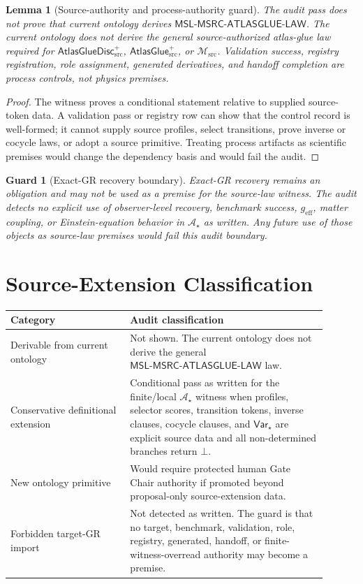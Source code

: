 \documentclass[11pt]{article}
\newcommand{\Msrc}{\mathcal{M}_{\mathrm{src}}}
\newcommand{\geff}{g_{\mathrm{eff}}}
\newcommand{\AtlasGlue}{\mathsf{AtlasGlue}_{\mathrm{src}}^{+}}
\newcommand{\AtlasGlueDisc}{\mathsf{AtlasGlueDisc}_{\mathrm{src}}^{+}}
\newcommand{\MSL}{\mathsf{MSL}\mbox{-}\mathsf{MSRC}\mbox{-}\mathsf{ATLASGLUE}\mbox{-}\mathsf{LAW}}
\newcommand{\Bot}{\bot}
\newcommand{\Astar}{\mathcal A_{\star}}
\newcommand{\Varstar}{\mathsf{Var}_{\star}}
\newtheorem{lemma}{Lemma}
\newtheorem{guard}{Guard}
\begin{document}
\begin{lemma}[Source-authority and process-authority guard]
The audit pass does not prove that current ontology derives \(\MSL\). The
current ontology does not derive the general source-authorized atlas-glue law
required for \(\AtlasGlueDisc\), \(\AtlasGlue\), or \(\Msrc\). Validation
success, registry registration, role assignment, generated derivatives, and
handoff completion are process controls, not physics premises.
\end{lemma}

\begin{proof}
The witness proves a conditional statement relative to supplied source-token
data. A validation pass or registry row can show that the control record is
well-formed; it cannot supply source profiles, select transitions, prove
inverse or cocycle laws, or adopt a source primitive. Treating process
artifacts as scientific premises would change the dependency basis and would
fail the audit.
\end{proof}

\begin{guard}[Exact-GR recovery boundary]
Exact-GR recovery remains an obligation and may not be used as a premise for
the source-law witness. The audit detects no explicit use of observer-level
recovery, benchmark success, \(\geff\), matter coupling, or
Einstein-equation behavior in \(\Astar\) as written. Any future use of those
objects as source-law premises would fail this audit boundary.
\end{guard}

\section{Source-Extension Classification}

\begin{center}
\begin{tabular}{p{0.34\linewidth}p{0.56\linewidth}}
\hline
Category & Audit classification \\
\hline
Derivable from current ontology & Not shown. The current ontology does not
derive the general \(\MSL\) law. \\
Conservative definitional extension & Conditional pass as written for the
finite/local \(\Astar\) witness when profiles, selector scores, transition
tokens, inverse clauses, cocycle clauses, and \(\Varstar\) are explicit
source data and all non-determined branches return \(\Bot\). \\
New ontology primitive & Would require protected human Gate Chair authority
if promoted beyond proposal-only source-extension data. \\
Forbidden target-GR import & Not detected as written. The guard is that no
target, benchmark, validation, role, registry, generated, handoff, or
finite-witness-overread authority may become a premise. \\
\hline
\end{tabular}
\end{center}
\end{document}
